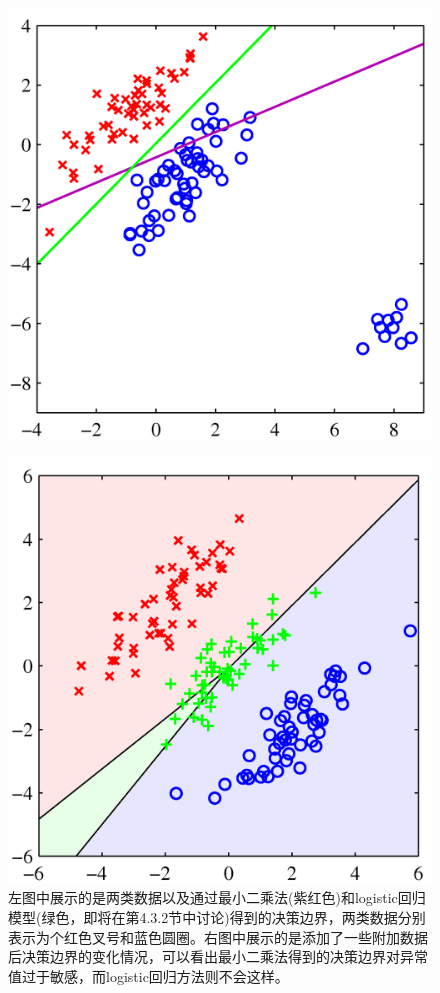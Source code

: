 \documentclass[b5paper]{book}
\numberwithin{equation}{chapter}
\begin{document}
{\begin{figure}[H]
\begin{minipage}[t]{0.5\linewidth}
		\label{fig:4-4a}
		\end{minipage}
		\begin{minipage}[t]{0.5\linewidth}
		\centering
		\includegraphics[scale=0.8]{Images/4-4b.png}
		\label{fig:4-4b}
		\end{minipage}
		\caption{左图中展示的是两类数据以及通过最小二乘法(紫红色)和logistic回归模型(绿色，即将在第4.3.2节中讨论)得到的决策边界，两类数据分别表示为个红色叉号和蓝色圆圈。右图中展示的是添加了一些附加数据后决策边界的变化情况，可以看出最小二乘法得到的决策边界对异常值过于敏感，而logistic回归方法则不会这样。}
		\begin{minipage}[t]{0.5\linewidth}
		\centering
		\includegraphics[scale=0.8]{Images/4-5a.png}

\end{minipage}
\end{figure}}
\end{document}
